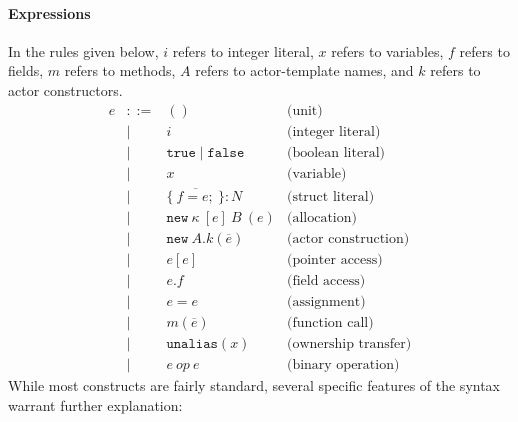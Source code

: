 \documentclass[a4paper,12pt,fleqn]{article}
\begin{document}
\paragraph{Expressions\\}
In the rules given below, $i$ refers to integer literal, $x$ refers to variables, $f$ refers to fields, $m$ refers to methods, $A$ refers to actor-template names, and $k$ refers to actor constructors.
\[
\begin{array}{lcll}
e & ::= & () & \text{(unit)} \\
  & \mid & i & \text{(integer literal)} \\
  & \mid & \mathtt{true} \mid \mathtt{false} & \text{(boolean literal)} \\
  & \mid & x & \text{(variable)} \\
  & \mid & \{\ \overline{f = e;}\ \} : N & \text{(struct literal)} \\
  & \mid & \mathtt{new}\ \kappa\ [e]\ B\ (e) & \text{(allocation)} \\
  & \mid & \mathtt{new}\ A.k(\overline{e}) & \text{(actor construction)} \\
  & \mid & e[e] & \text{(pointer access)} \\
  & \mid & e.f & \text{(field access)} \\
  & \mid & e = e & \text{(assignment)} \\
  & \mid & m(\overline{e}) & \text{(function call)} \\
  & \mid & \mathtt{unalias}(x) & \text{(ownership transfer)}\\
  & \mid & e\ \mathit{op}\ e & \text{(binary operation)}
\end{array}
\]
While most constructs are fairly standard, several specific features of the syntax warrant further explanation:
\end{document}
